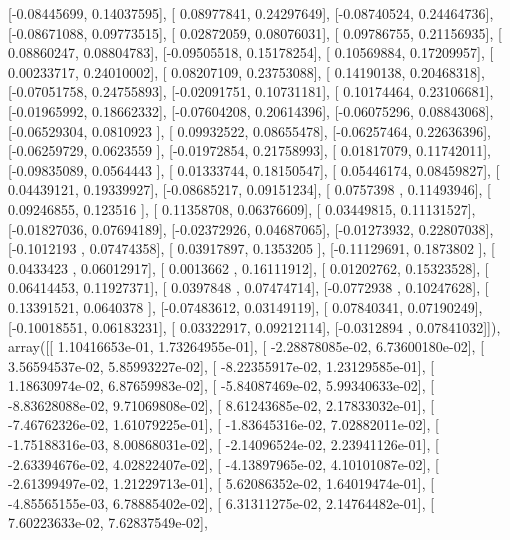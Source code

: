 \documentclass{article}
\begin{document}
       [-0.08445699,  0.14037595],
       [ 0.08977841,  0.24297649],
       [-0.08740524,  0.24464736],
       [-0.08671088,  0.09773515],
       [ 0.02872059,  0.08076031],
       [ 0.09786755,  0.21156935],
       [ 0.08860247,  0.08804783],
       [-0.09505518,  0.15178254],
       [ 0.10569884,  0.17209957],
       [ 0.00233717,  0.24010002],
       [ 0.08207109,  0.23753088],
       [ 0.14190138,  0.20468318],
       [-0.07051758,  0.24755893],
       [-0.02091751,  0.10731181],
       [ 0.10174464,  0.23106681],
       [-0.01965992,  0.18662332],
       [-0.07604208,  0.20614396],
       [-0.06075296,  0.08843068],
       [-0.06529304,  0.0810923 ],
       [ 0.09932522,  0.08655478],
       [-0.06257464,  0.22636396],
       [-0.06259729,  0.0623559 ],
       [-0.01972854,  0.21758993],
       [ 0.01817079,  0.11742011],
       [-0.09835089,  0.0564443 ],
       [ 0.01333744,  0.18150547],
       [ 0.05446174,  0.08459827],
       [ 0.04439121,  0.19339927],
       [-0.08685217,  0.09151234],
       [ 0.0757398 ,  0.11493946],
       [ 0.09246855,  0.123516  ],
       [ 0.11358708,  0.06376609],
       [ 0.03449815,  0.11131527],
       [-0.01827036,  0.07694189],
       [-0.02372926,  0.04687065],
       [-0.01273932,  0.22807038],
       [-0.1012193 ,  0.07474358],
       [ 0.03917897,  0.1353205 ],
       [-0.11129691,  0.1873802 ],
       [ 0.0433423 ,  0.06012917],
       [ 0.0013662 ,  0.16111912],
       [ 0.01202762,  0.15323528],
       [ 0.06414453,  0.11927371],
       [ 0.0397848 ,  0.07474714],
       [-0.0772938 ,  0.10247628],
       [ 0.13391521,  0.0640378 ],
       [-0.07483612,  0.03149119],
       [ 0.07840341,  0.07190249],
       [-0.10018551,  0.06183231],
       [ 0.03322917,  0.09212114],
       [-0.0312894 ,  0.07841032]]), array([[  1.10416653e-01,   1.73264955e-01],
       [ -2.28878085e-02,   6.73600180e-02],
       [  3.56594537e-02,   5.85993227e-02],
       [ -8.22355917e-02,   1.23129585e-01],
       [  1.18630974e-02,   6.87659983e-02],
       [ -5.84087469e-02,   5.99340633e-02],
       [ -8.83628088e-02,   9.71069808e-02],
       [  8.61243685e-02,   2.17833032e-01],
       [ -7.46762326e-02,   1.61079225e-01],
       [ -1.83645316e-02,   7.02882011e-02],
       [ -1.75188316e-03,   8.00868031e-02],
       [ -2.14096524e-02,   2.23941126e-01],
       [ -2.63394676e-02,   4.02822407e-02],
       [ -4.13897965e-02,   4.10101087e-02],
       [ -2.61399497e-02,   1.21229713e-01],
       [  5.62086352e-02,   1.64019474e-01],
       [ -4.85565155e-03,   6.78885402e-02],
       [  6.31311275e-02,   2.14764482e-01],
       [  7.60223633e-02,   7.62837549e-02],
\end{document}
